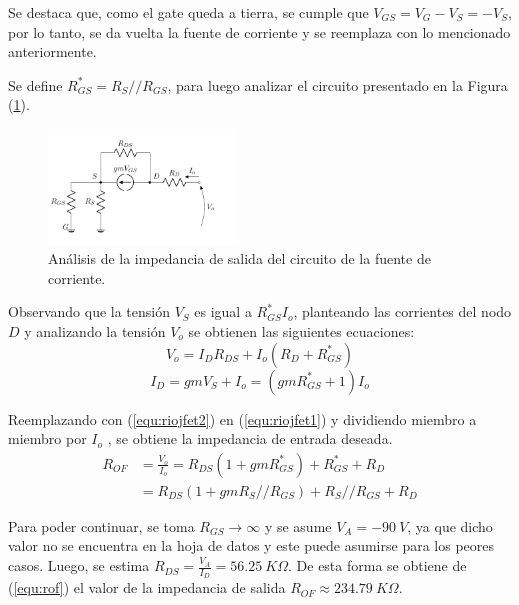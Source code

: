 Se destaca que, como el gate queda a tierra, se cumple que $V_{GS} = V_G - V_S = - V_S$, por lo tanto, se da vuelta la fuente de corriente y se reemplaza con lo mencionado anteriormente. 

Se define $R_{GS}^* = R_S // R_{GS}$, para luego analizar el circuito presentado en la Figura (\ref{fig:incfuente2}).
\begin{figure}[H]
\centering
\hspace*{2cm}
	\includegraphics[width=0.45\textwidth, page=2]{Imagenes/ModeloIncremental.pdf}
	\caption{Análisis de la impedancia de salida del circuito de la fuente de corriente.}
\label{fig:incfuente2}
\end{figure}

Observando que la tensión $V_S$ es igual a $R_{GS}^{*} I_o$, planteando las corrientes del nodo $D$ y analizando la tensión $V_o$ se obtienen las siguientes ecuaciones:
\begin{equation}
	V_o = I_{D} R_{DS} + I_o \left( R_D + R_{GS}^* \right)
	\label{equ:riojfet1}
\end{equation}
\begin{equation}
	I_{D} = gm V_S + I_o = \left( gm R_{GS}^* + 1 \right) I_o
	\label{equ:riojfet2}
\end{equation}

Reemplazando con (\ref{equ:riojfet2}) en (\ref{equ:riojfet1}) y dividiendo miembro a miembro por $I_o$ , se obtiene la impedancia de entrada deseada.
\begin{equation}
\begin{split}
	R_{OF} & = \frac{V_o}{I_o} = R_{DS} \left( 1 + gm R_{GS}^* \right) + R_{GS}^* + R_D \\
		   & = R_{DS} \left( 1 + gm R_S//R_{GS} \right) + R_S//R_{GS} + R_D
\end{split}
\label{equ:rof}
\end{equation}

Para poder continuar, se toma $R_{GS} \longrightarrow \infty$ y se asume $V_A = -90 \ V$, ya que dicho valor no se encuentra en la hoja de datos y este puede asumirse para los peores casos. Luego, se estima $R_{DS} = \frac{V_A}{I_{D}} = 56.25 \ K\Omega$. De esta forma se obtiene de (\ref{equ:rof}) el valor de la impedancia de salida $R_{OF} \approx 234.79 \ K\Omega$.

